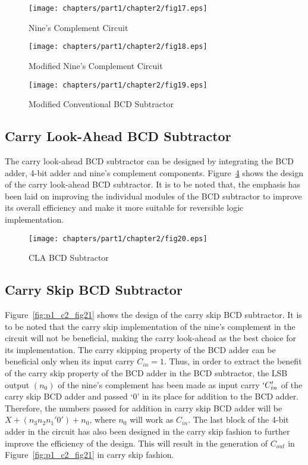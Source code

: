 \begin{figure}[!tbh]
	\centering
	\texttt{[image: chapters/part1/chapter2/fig17.eps]}
	\caption{Nine's Complement Circuit}
	\label{fig:p1_c2_fig17}
\end{figure}


\begin{figure}[!tbh]
	\centering
	\texttt{[image: chapters/part1/chapter2/fig18.eps]}
	\caption{Modified Nine's Complement Circuit}
	\label{fig:p1_c2_fig18}
\end{figure}

\begin{figure}[!tbh]
	\centering
	\texttt{[image: chapters/part1/chapter2/fig19.eps]}
	\caption{Modified Conventional BCD Subtractor}
	\label{fig:p1_c2_fig19}
\end{figure}

\subsection{Carry Look-Ahead BCD Subtractor}

The carry look-ahead BCD subtractor can be designed by integrating the BCD adder, 4-bit adder and nine's complement components. Figure~\ref{fig:p1_c2_fig20} shows the design of the carry look-ahead BCD subtractor. It is to be noted that, the emphasis has been laid on improving the individual modules of the BCD subtractor to improve its overall efficiency and make it more suitable for reversible logic implementation.

\begin{figure}[!tbh]
	\centering
	\texttt{[image: chapters/part1/chapter2/fig20.eps]}
	\caption{CLA BCD Subtractor}
	\label{fig:p1_c2_fig20}
\end{figure}

\subsection{Carry Skip BCD Subtractor}

Figure~\ref{fig:p1_c2_fig21} shows the design of the carry skip BCD subtractor. It is to be noted that the carry skip implementation of the nine's complement in the circuit will not be beneficial, making the carry look-ahead as the best choice for its implementation. The carry skipping property of the BCD adder can be beneficial only when its input carry $C_{in}=1$. Thus, in order to extract the benefit of the carry skip property of the BCD adder in the BCD subtractor, the LSB output $(n_0)$ of the nine's complement has been made as input carry $`C_{in}'$ of the carry skip BCD adder and passed `0' in its place for addition to the BCD adder. Therefore, the numbers passed for addition in carry skip BCD adder will be $X+(n_3 n_2 n_1'0')+n_0$, where $n_0$ will work as $C_{in}$. The last block of the 4-bit adder in the circuit has also been designed in the carry skip fashion to further improve the efficiency of the design. This will result in the generation of $C_{out}$ in Figure~\ref{fig:p1_c2_fig21} in carry skip fashion. 


